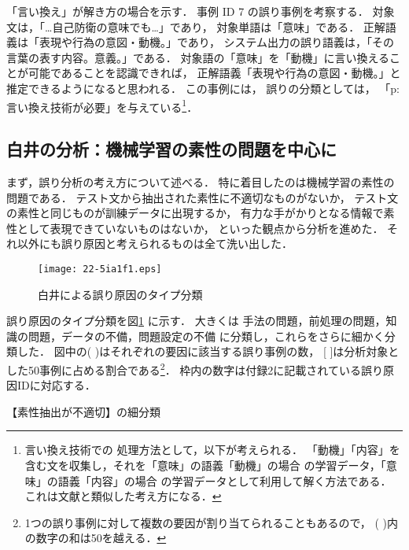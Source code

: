 \documentclass[japanese]{jnlp_1.4}
\begin{document}
「言い換え」が解き方の場合を示す．
事例 ID 7 の誤り事例を考察する．
対象文は，「…自己防衛の意味でも…」であり，
対象単語は「意味」である．
正解語義は「表現や行為の意図・動機。」であり，
システム出力の誤り語義は，「その言葉の表す内容。意義。」である．
対象語の「意味」を「動機」に言い換えることが可能であることを認識できれば，
正解語義「表現や行為の意図・動機。」と推定できるようになると思われる．
この事例には，
誤りの分類としては，
「p: 言い換え技術が必要」を与えている\footnote{言い換え技術での
処理方法として，以下が考えられる．
「動機」「内容」を含む文を収集し，それを「意味」の語義「動機」の場合
の学習データ，「意味」の語義「内容」の場合
の学習データとして利用して解く方法である．
これは文献\cite{Mihalcea1999,Goda2013}と類似した考え方になる．}．



\subsection{白井の分析：機械学習の素性の問題を中心に}

まず，誤り分析の考え方について述べる．
特に着目したのは機械学習の素性の問題である．
テスト文から抽出された素性に不適切なものがないか，
テスト文の素性と同じものが訓練データに出現するか，
有力な手がかりとなる情報で素性として表現できていないものはないか，
といった観点から分析を進めた．
それ以外にも誤り原因と考えられるものは全て洗い出した．

\begin{figure}[b]
\vspace{-0.5\Cvs}
\begin{center}
\texttt{[image: 22-5ia1f1.eps]}
\end{center}
\caption{白井による誤り原因のタイプ分類}
\label{fig:typology-sirai}
\vspace{-0.5\Cvs}
\end{figure}

誤り原因のタイプ分類を図{\ref{fig:typology-sirai}} に示す．
大きくは
手法の問題，前処理の問題，知識の問題，データの不備，問題設定の不備
に分類し，これらをさらに細かく分類した．
図中の( )はそれぞれの要因に該当する誤り事例の数，
[ ]は分析対象とした50事例に占める割合である\footnote{
  1つの誤り事例に対して複数の要因が割り当てられることもあるので，
  ( )内の数字の和は50を越える．
}．
枠内の数字は付録2に記載されている誤り原因IDに対応する．

\begin{table}[b]
\caption{【素性抽出が不適切】の細分類}
\label{tab:inapproriate-feature}

\end{table}
\end{document}
